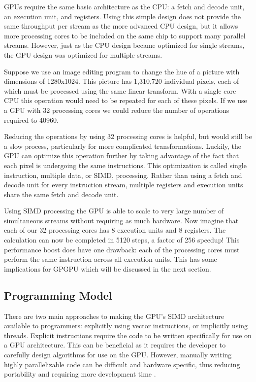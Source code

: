 GPUs require the same basic architecture as the CPU: a fetch and decode unit, an execution unit, and registers. Using this simple design does not provide the same throughput per stream as the more advanced CPU design, but it allows more processing cores to be included on the same chip to support many parallel streams. However, just as the CPU design became optimized for single streams, the GPU design was optimized for multiple streams.

Suppose we use an image editing program to change the hue of a picture with dimensions of 1280x1024. This picture has 1,310,720 individual pixels, each of which must be processed using the same linear transform. With a single core CPU this operation would need to be repeated for each of these pixels. If we use a GPU with 32 processing cores we could reduce the number of operations required to 40960.

Reducing the operations by using 32 processing cores is helpful, but would still be a slow process, particularly for more complicated transformations. Luckily, the GPU can optimize this operation further by taking advantage of the fact that each pixel is undergoing the same instructions. This optimization is called single instruction, multiple data, or SIMD, processing. Rather than using a fetch and decode unit for every instruction stream, multiple registers and execution units share the same fetch and decode unit.

Using SIMD processing the GPU is able to scale to very large number of simultaneous streams without requiring as much hardware. Now imagine that each of our 32 processing cores has 8 execution units and 8 registers. The calculation can now be completed in 5120 steps, a factor of 256 speedup! This performance boost does have one drawback: each of the processing cores must perform the same instruction across all execution units. This has some implications for GPGPU which will be discussed in the next section.

\subsection{Programming Model}

There are two main approaches to making the GPU's SIMD architecture available to programmers: explicitly using vector instructions, or implicitly using threads. Explicit instructions require the code to be written specifically for use on a GPU architecture. This can be beneficial as it requires the developer to carefully design algorithms for use on the GPU. However, manually writing highly parallelizable code can be difficult and hardware specific, thus reducing portability and requiring more development time \cite{GPGPU}.

